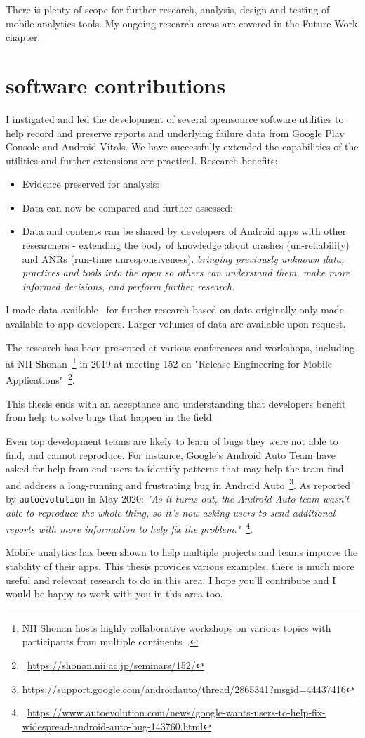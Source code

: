 There is plenty of scope for further research, analysis, design and testing of mobile analytics tools. My ongoing research areas are covered in the Future Work chapter.

\section{software contributions}
I instigated and led the development of several opensource software utilities to help record and preserve reports and underlying failure data from Google Play Console and Android Vitals. We have successfully extended the capabilities of the utilities and further extensions are practical. Research benefits:
\begin{itemize}
    \item Evidence preserved for analysis:
    \item Data can now be compared and further assessed:
    \item Data and contents can be shared by developers of Android apps with other researchers - extending the body of knowledge about crashes (un-reliability) and ANRs (run-time unresponsiveness). \emph{bringing previously unknown data, practices and tools into the open so others can understand them, make more informed decisions, and perform further research.}
\end{itemize}

I made data available~\cite{harty_wama_dataset_examples} for further research based on data originally only made available to app developers. Larger volumes of data are available upon request.

The research has been presented at various conferences and workshops, including at NII Shonan~\footnote{NII Shonan hosts highly collaborative workshops on various topics with participants from multiple continents~\citep{acm_shonan_workshops_2020}.} in 2019 at meeting 152 on "Release Engineering for Mobile Applications"~\footnote{~\url{https://shonan.nii.ac.jp/seminars/152/}}.

This thesis ends with an acceptance and understanding that developers benefit from help to solve bugs that happen in the field.

Even top development teams are likely to learn of bugs they were not able to find, and cannot reproduce. For instance, Google's Android Auto Team have asked for help from end users to identify patterns that may help the team find and address a long-running and frustrating bug in Android Auto~\footnote{\url{https://support.google.com/androidauto/thread/2865341?msgid=44437416}}. As reported by \texttt{autoevolution} in May 2020:  
\emph{"As it turns out, the Android Auto team wasn’t able to reproduce the whole thing, so it’s now asking users to send additional reports with more information to help fix the problem."}~\footnote{~\url{https://www.autoevolution.com/news/google-wants-users-to-help-fix-widespread-android-auto-bug-143760.html}}.

Mobile analytics has been shown to help multiple projects and teams improve the stability of their apps. This thesis provides various examples, there is much more useful and relevant research to do in this area. I hope you'll contribute and I would be happy to work with you in this area too. 